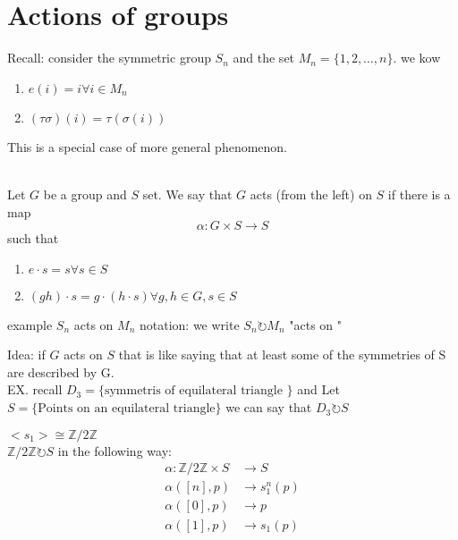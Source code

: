 \documentclass{article}
\begin{document}
\section*{Actions of groups }
Recall: consider the symmetric group $S_n$ and the set $M_n = \{1, 2, \dots, n\}$. we kow \begin{enumerate}
    \item $e(i) = i \forall i \in M_n$
    \item $(\tau  \sigma)(i) = \tau(\sigma(i))$ 
\end{enumerate}
This is a special case of more general phenomenon. 
\begin{definition}[2.10.1]\leavevmode \\ 
    Let $G$ be a group and $S$ set. We say that $G$ acts (from the left) on $S$ if there is a map 
    $$\alpha: G \times S \to S$$ 
    such that 
    \begin{enumerate}
        \item $e \cdot s = s \forall s\in S$
        \item $(gh) \cdot s = g \cdot (h \cdot s) \forall g,h\in G, s\in S$
    \end{enumerate} 
    
\end{definition}
example $S_n$ acts on $M_n$ notation: we write $S_n \circlearrowright M_n $ "acts on " 

Idea: if $G$ acts on $S$ that is like saying that at least some of the symmetries of S are described by G. 
\\ EX. recall $D_3 = \{\text{symmetris of equilateral triangle }\}$  and Let $S = \{\text{Points on an equilateral triangle}\}$ we can say that $D_3 \circlearrowright S$

$<s_1> \cong \mathbb{Z} / 2\mathbb{Z}$ \\ 
$\mathbb{Z} / 2 \mathbb{Z} \circlearrowright S$ in the following way: 
\begin{align*}
    \alpha: \mathbb{Z} / 2\mathbb{Z} \times S &\to S \\
    \alpha([n], p) &\to s_1^n (p)\\
    \alpha([0], p) &\to p\\
    \alpha([1], p) &\to s_1(p)
\end{align*}
\end{document}
